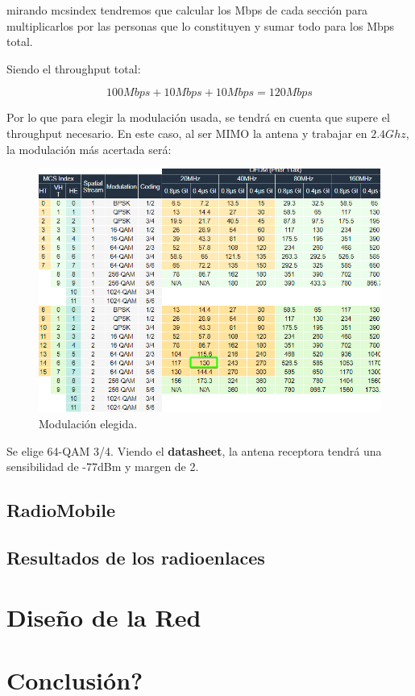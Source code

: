 \documentclass{article}
\begin{document}
mirando mcsindex tendremos que calcular los Mbps de cada sección para multiplicarlos por las personas que lo constituyen y sumar todo para los Mbps total. 

Siendo el throughput total:

$$100Mbps + 10Mbps + 10Mbps = 120Mbps$$

Por lo que para elegir la modulación usada, se tendrá en cuenta que supere el throughput necesario. En este caso, al ser MIMO la antena y trabajar en $2.4Ghz$, la modulación más acertada será:

\begin{figure}[ht]
    \centering
    \includegraphics[width=0.8
    \linewidth]{src/chrome_GUtrJRqsad.png}
    \caption{\label{fig:mcsindex} Modulación elegida.}
\end{figure}
\newpage
Se elige 64-QAM 3/4. Viendo el \textbf{datasheet}, la antena receptora tendrá una sensibilidad de -77dBm y margen de 2.

\subsection{RadioMobile}

\subsection{Resultados de los radioenlaces}

\section{Diseño de la Red}

\section{Conclusión?}
\end{document}

